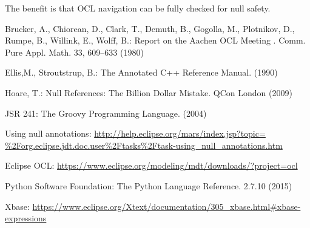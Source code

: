 \documentclass{llncs}
\begin{document}
The benefit is that OCL navigation can be fully checked for null safety.

%
%
\begin{thebibliography}{}
%
Brucker, A., Chiorean, D., Clark, T., Demuth, B., Gogolla, M., Plotnikov, D., Rumpe, B., Willink, E., Wolff, B.:
Report on the Aachen OCL Meeting .
Comm. Pure Appl. Math. 33, 609--633 (1980)

Ellis,M., Stroutstrup, B.:
The Annotated C++ Reference Manual.
(1990)

Hoare, T.:
Null References: The Billion Dollar Mistake.
QCon London (2009)

JSR 241:
The Groovy Programming Language.
(2004)

Using null annotations:
\url{http://help.eclipse.org/mars/index.jsp?topic=
\%2Forg.eclipse.jdt.doc.user\%2Ftasks\%2Ftask-using\_null\_annotations.htm}

Eclipse OCL:
\url{https://www.eclipse.org/modeling/mdt/downloads/?project=ocl}

Python Software Foundation:
The Python Language Reference.
2.7.10 (2015)

Xbase:
\url{https://www.eclipse.org/Xtext/documentation/305\_xbase.html\#xbase-expressions}

\end{thebibliography}
\end{document}
